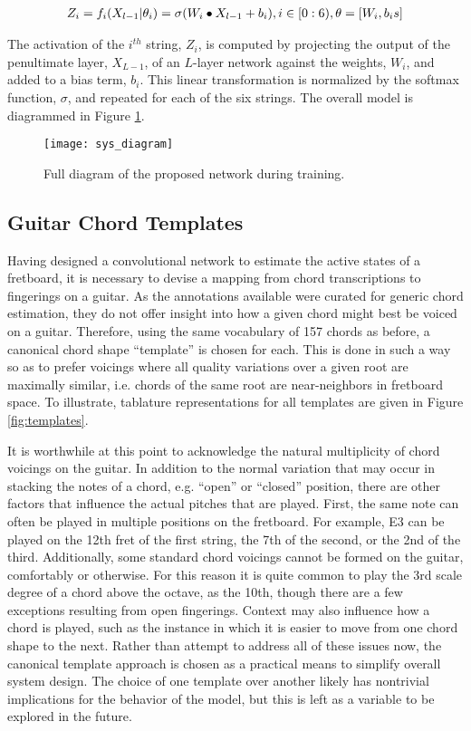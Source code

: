 \begin{align*}
\label{eq:softmax_layer}
\small
Z_i = f_i(X_{l-1} \vert \theta_i) = \sigma (W_i \bullet X_{l-1} + b_i), i \in [0:6), \theta = [W_i, b_is]
\end{align*}

\noindent The activation of the $i^{th}$ string, $Z_i$, is computed by projecting the output of the penultimate layer, $X_{L-1}$, of an $L$-layer network against the weights, $W_i$, and added to a bias term, $b_i$.
This linear transformation is normalized by the softmax function, $\sigma$, and repeated for each of the six strings.
The overall model is diagrammed in Figure \ref{fig:guitarnet}.

\begin{figure}[t!]
  \centering
  \centerline{\texttt{[image: sys\_diagram]}}
\caption{Full diagram of the proposed network during training.}
\label{fig:guitarnet}
%
\end{figure}


\subsection{Guitar Chord Templates}
\label{subsec:vocabulary}

Having designed a convolutional network to estimate the active states of a fretboard, it is necessary to devise a mapping from chord transcriptions to fingerings on a guitar.
As the annotations available were curated for generic chord estimation, they  do not offer insight into how a given chord might best be voiced on a guitar.
Therefore, using the same vocabulary of 157 chords as before, a canonical chord shape ``template'' is chosen for each.
This is done in such a way so as to prefer voicings where all quality variations over a given root are maximally similar, i.e. chords of the same root are near-neighbors in fretboard space.
To illustrate, tablature representations for all templates are given in Figure \ref{fig:templates}.

It is worthwhile at this point to acknowledge the natural multiplicity of chord voicings on the guitar.
In addition to the normal variation that may occur in stacking the notes of a chord, e.g. ``open'' or ``closed'' position, there are other factors that influence the actual pitches that are played.
First, the same note can often be played in multiple positions on the fretboard.
For example, E3 can be played on the 12th fret of the first string, the 7th of the second, or the 2nd of the third.
Additionally, some standard chord voicings cannot be formed on the guitar, comfortably or otherwise.
For this reason it is quite common to play the 3rd scale degree of a chord above the octave, as the 10th, though there are a few exceptions resulting from open fingerings.
Context may also influence how a chord is played, such as the instance in which it is easier to move from one chord shape to the next.
Rather than attempt to address all of these issues now, the canonical template approach is chosen as a practical means to simplify overall system design.
The choice of one template over another likely has nontrivial implications for the behavior of the model, but this is left as a variable to be explored in the future.


